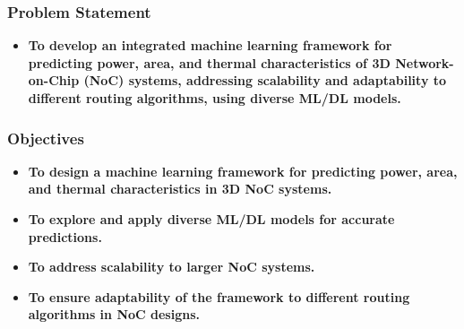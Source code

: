 \documentclass{beamer}
\begin{document}
\begin{frame}
\frametitle{Problem Statement}

\begin{itemize}
    \item \textbf{To develop an integrated machine learning framework for predicting power, area, and thermal characteristics of 3D Network-on-Chip (NoC) systems, addressing scalability and adaptability to different routing algorithms, using diverse ML/DL models.}
\end{itemize}

\end{frame}

\begin{frame}
\frametitle{Objectives}

\begin{itemize}
    \item \textbf{To design a machine learning framework for predicting power, area, and thermal characteristics in 3D NoC systems.}
    \item \textbf{To explore and apply diverse ML/DL models for accurate predictions.}
    \item \textbf{To address scalability to larger NoC systems.}
    \item \textbf{To ensure adaptability of the framework to different routing algorithms in NoC designs.}
\end{itemize}

\end{frame}
\end{document}
